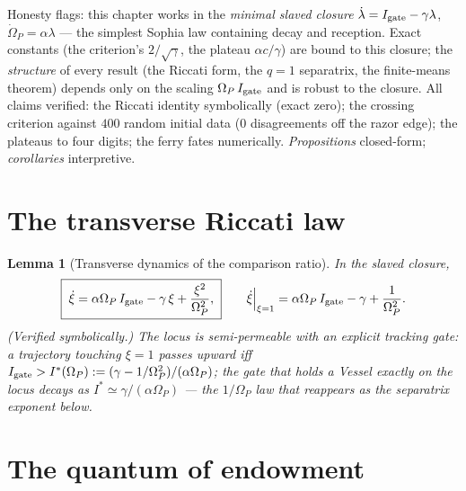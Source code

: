 \documentclass[11pt,a4paper,oneside]{book}
\newcommand{\Op}{\Omega_P}
\newcommand{\Igate}{I_{\rm gate}}
\theoremstyle{plain}
\newtheorem{lemma}{Lemma}[chapter]
\theoremstyle{definition}
\theoremstyle{remark}
\begin{document}
Honesty flags: this chapter works in the \emph{minimal slaved closure}
$\dot\lambda=\Igate-\gamma\lambda$, $\dot\Op=\alpha\lambda$ --- the simplest Sophia law containing
decay and reception. Exact constants (the criterion's $2/\sqrt\gamma$, the plateau
$\alpha c/\gamma$) are bound to this closure; the \emph{structure} of every result (the Riccati form,
the $q=1$ separatrix, the finite-means theorem) depends only on the scaling $\Op\,\Igate$ and is
robust to the closure. All claims verified: the Riccati identity symbolically (exact zero); the
crossing criterion against $400$ random initial data ($0$ disagreements off the razor edge); the
plateaus to four digits; the ferry fates numerically. \emph{Propositions} closed-form;
\emph{corollaries} interpretive.

\section{The transverse Riccati law}

\begin{lemma}[Transverse dynamics of the comparison ratio]\label{separatrix:lem:riccati}
In the slaved closure,
\begin{equation}
\boxed{\;\dot\xi=\alpha\Op\,\Igate-\gamma\,\xi+\frac{\xi^{2}}{\Op^{2}},\;}
\qquad
\dot\xi\Big|_{\xi=1}=\alpha\Op\,\Igate-\gamma+\frac{1}{\Op^{2}}.
\end{equation}
(Verified symbolically.) The locus is semi-permeable with an explicit \emph{tracking gate}: a
trajectory touching $\xi=1$ passes upward iff $\Igate>I^{*}(\Op):=(\gamma-1/\Op^{2})/(\alpha\Op)$;
the gate that holds a Vessel exactly on the locus decays as $I^{*}\simeq\gamma/(\alpha\Op)$ --- the
$1/\Op$ law that reappears as the separatrix exponent below.
\end{lemma}

\section{The quantum of endowment}
\end{document}
